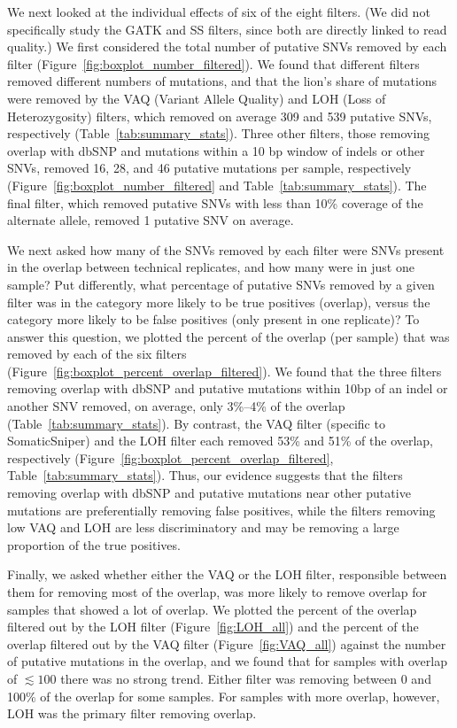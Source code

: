 \documentclass[11pt]{article} %
\begin{document}
We next looked at the individual effects of six of the eight filters. (We did not specifically study the GATK and SS filters, since both are directly linked to read quality.) We first considered the total number of putative SNVs removed by each filter (Figure~\ref{fig:boxplot_number_filtered}). We found that different filters removed different numbers of mutations, and that the lion's share of mutations were removed by the VAQ (Variant Allele Quality) and LOH (Loss of Heterozygosity) filters, which removed on average 309 and 539 putative SNVs, respectively (Table~\ref{tab:summary_stats}). Three other filters, those removing overlap with dbSNP and mutations within a 10 bp window of indels or other SNVs, removed 16, 28, and 46 putative mutations per sample, respectively (Figure~\ref{fig:boxplot_number_filtered} and Table~\ref{tab:summary_stats}). The final filter, which removed putative SNVs with less than 10\% coverage of the alternate allele, removed 1 putative SNV on average. 

We next asked how many of the SNVs removed by each filter were SNVs present in the overlap between technical replicates, and how many were in just one sample? Put differently, what percentage of putative SNVs removed by a given filter was in the category more likely to be true positives (overlap), versus the category more likely to be false positives (only present in one replicate)? To answer this question, we plotted the percent of the overlap (per sample) that was removed by each of the six filters (Figure~\ref{fig:boxplot_percent_overlap_filtered}). We found that the three filters removing overlap with dbSNP and putative mutations within 10bp of an indel or another SNV removed, on average, only 3\%--4\% of the overlap (Table~\ref{tab:summary_stats}). By contrast, the VAQ filter (specific to SomaticSniper) and the LOH filter each removed 53\% and 51\% of the overlap, respectively (Figure~\ref{fig:boxplot_percent_overlap_filtered}, Table~\ref{tab:summary_stats}). Thus, our evidence suggests that the filters removing overlap with dbSNP and putative mutations near other putative mutations are preferentially removing false positives, while the filters removing low VAQ and LOH are less discriminatory and may be removing a large proportion of the true positives. 

Finally, we asked whether either the VAQ or the LOH filter, responsible between them for removing most of the overlap, was more likely to remove overlap for samples that showed a lot of overlap. We plotted the percent of the overlap filtered out by the LOH filter (Figure~\ref{fig:LOH_all}) and the percent of the overlap filtered out by the VAQ filter (Figure~\ref{fig:VAQ_all}) against the number of putative mutations in the overlap, and we found that for samples with overlap of $\lesssim 100$ there was no strong trend. Either filter was removing between 0 and 100\% of the overlap for some samples. For samples with more overlap, however, LOH was the primary filter removing overlap.   
\end{document}
